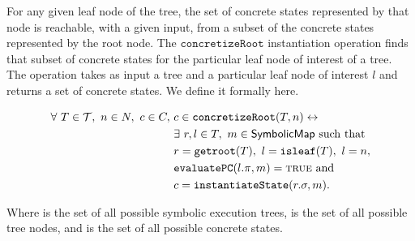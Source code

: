 

\begin{mydefinition}
  \label{def:concroot}
  
  For any given leaf node of the
  tree, the set of concrete states represented by that node is reachable, with a
  given input, from a subset of the concrete states represented by the root
  node. The $\mathtt{concretizeRoot}$ instantiation operation finds that subset of concrete states
  for the particular leaf node of interest of a tree. The operation takes as
  input a tree \tree{} and a particular leaf node of interest $l$ and returns
  a set of concrete states. We define it formally here.

  \begin{align*}
\forall~ T \in \mathcal{T},~n \in N,~ c \in C,~& c \in
\mathtt{concretizeRoot}(T,n) \leftrightarrow \\
&\exists~ r,l \in T,~m \in \textsf{SymbolicMap} \mathrm{~such~that}\\
&r = \mathtt{getroot}(T),~ l = \mathtt{isleaf}(T),~ l = n,\\
&\mathtt{evaluatePC}(l.\pi, m) = \mathtt{\textsc{true}}~ \mathrm{and} \\
&c = \mathtt{instantiateState}(r.\sigma, m).
    \end{align*}
\end{mydefinition}



Where \trees{} is the set of all possible symbolic execution trees, \nodes{} is
the set of all possible tree nodes, and
\concstates{} is the set of all possible concrete states.

